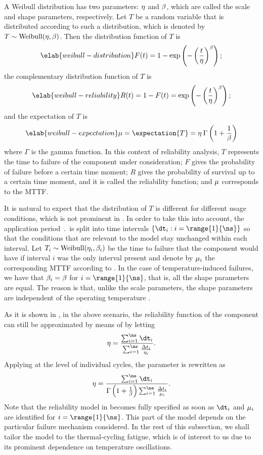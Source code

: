 A Weibull distribution has two parameters: $\eta$ and $\beta$, which are
called the scale and shape parameters, respectively. Let $T$ be a random
variable that is distributed according to such a distribution, which is denoted
by $T \sim \mathrm{Weibull}(\eta, \beta)$. Then the distribution function
\cite{durrett2010} of $T$ is
\begin{equation} \elab{weibull-distribution}
  F(t) = 1 - \exp\left(-\left(\frac{t}{\scale}\right)^\shape\right);
\end{equation}
the complementary distribution function of $T$ is
\begin{equation} \elab{weibull-reliability}
  R(t) = 1 - F(t) = \exp\left(-\left(\frac{t}{\scale}\right)^\shape\right);
\end{equation}
and the expectation of $T$ is
\begin{equation} \elab{weibull-expectation}
  \mean = \expectation{T} = \scale \: \Gamma\left(1 + \frac{1}{\shape}\right)
\end{equation}
where $\Gamma$ is the gamma function. In this context of reliability analysis,
$T$ represents the time to failure of the component under consideration; $F$
gives the probability of failure before a certain time moment; $R$ gives the
probability of survival up to a certain time moment, and it is called the
reliability function; and $\mu$ corresponds to the \ac{MTTF}.

It is natural to expect that the distribution of $T$ is different for different
usage conditions, which is not prominent in . In
order to take this into account, the application period $\period$ is split into
\ns time intervals $\{ \dt_i: i = \range{1}{\ns} \}$ so that the conditions that
are relevant to the model stay unchanged within each interval. Let $T_i \sim
\mathrm{Weibull}(\eta_i, \beta_i)$ be the time to failure that the component
would have if interval $i$ was the only interval present and denote by $\mu_i$
the corresponding \ac{MTTF} according to . In the case
of temperature-induced failures, we have that $\beta_i = \beta$ for $i =
\range{1}{\ns}$, that is, all the shape parameters are equal. The reason is
that, unlike the scale parameters, the shape parameters are independent of the
operating temperature \cite{chang2006}.

As it is shown in \cite{xiang2010}, in the above scenario, the reliability
function of the component can still be approximated by means of
 by letting
\[
  \scale = \frac{\sum_{i = 1}^\ns \dt_i}{\sum_{i = 1}^\ns \frac{\Delta t_i}{\scale_i}}.
\]
Applying  at the level of individual cycles, the
parameter is rewritten as
\[
  \scale = \frac{\sum_{i = 1}^\ns \dt_i}{\Gamma\left(1 + \frac{1}{\shape}\right) \sum_{i = 1}^\ns \frac{\Delta t_i}{\mean_i}}.
\]
Note that the reliability model in  becomes fully
specified as soon as $\dt_i$ and $\mu_i$ are identified for $i =
\range{1}{\ns}$. This part of the model depends on the particular failure
mechanism considered. In the rest of this subsection, we shall tailor the model
to the thermal-cycling fatigue, which is of interest to us due to its prominent
dependence on temperature oscillations.

